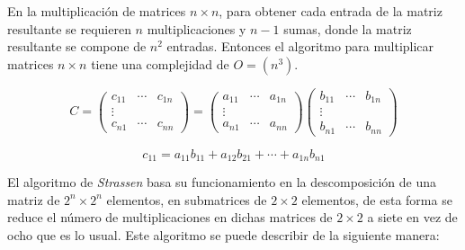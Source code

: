 \documentclass[12pt,letterpaper]{article}
\begin{document}
En la multiplicación de matrices $n\times n$, para obtener cada entrada de la matriz resultante se requieren $n$ multiplicaciones y $n-1$ sumas, donde la matriz resultante se compone de $n^2$ entradas. Entonces el algoritmo para multiplicar matrices $n\times n$ tiene una complejidad de $O=(n^3)$.

\vspace*{0.5em}

\begin{equation*}
C=
\left(
    \begin{array}{ccc}
        c_{11} & \cdots & c_{1n}\\
        \vdots\\
        c_{n1} & \cdots & c_{nn}
    \end{array}
\right)
=
\left(
    \begin{array}{ccc}
        a_{11} & \cdots & a_{1n}\\
        \vdots\\
        a_{n1} & \cdots & a_{nn}
    \end{array}
\right)
\left(
    \begin{array}{ccc}
        b_{11} & \cdots & b_{1n}\\
        \vdots\\
        b_{n1} & \cdots & b_{nn}
    \end{array}
\right)
\label{m1}
\end{equation*}

\begin{equation*}
	c_{11}= a_{11}b_{11}+a_{12}b_{21}+\cdots+a_{1n}b_{n1}
\end{equation*}

\vspace*{0.5em}

El algoritmo de \textit{Strassen} basa su funcionamiento en la descomposición de una matriz de $2^{n}\times 2^{n}$ elementos, en submatrices de $2\times2$ elementos, de esta forma se reduce el número de multiplicaciones en dichas matrices de $2\times2$ a siete en vez de ocho que es lo usual. Este algoritmo se puede describir de la siguiente manera:

\end{document}
